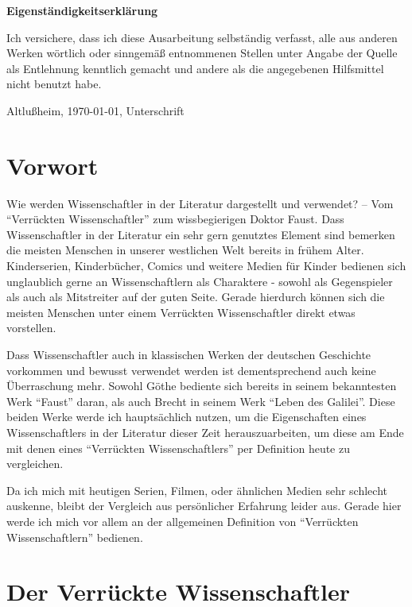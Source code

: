 \documentclass[12pt]{scrreprt}
\begin{document}
\makeititle
\begin{center}
	\sffamily\bfseries{Eigenständigkeitserklärung}
\end{center}
Ich versichere, dass ich diese Ausarbeitung selbständig verfasst, alle aus
anderen Werken wörtlich oder sinngemäß entnommenen Stellen unter Angabe der
Quelle als Entlehnung kenntlich gemacht und andere als die angegebenen
Hilfsmittel nicht benutzt habe.

Altlußheim, \today, Unterschrift
\tableofcontents
\listoftables

\chapter{Vorwort}
	\label{chap:vorwort}
Wie werden Wissenschaftler in der Literatur dargestellt und verwendet? – Vom \enquote{Verrückten Wissenschaftler} zum wissbegierigen Doktor Faust.
\smallskip\newline
Dass Wissenschaftler in der Literatur ein sehr gern genutztes Element sind bemerken die meisten Menschen in unserer westlichen Welt bereits in frühem Alter. 
Kinderserien, Kinderbücher, Comics und weitere Medien für Kinder bedienen sich unglaublich gerne an Wissenschaftlern als Charaktere - sowohl als Gegenspieler als auch als Mitstreiter auf der guten Seite.
Gerade hierdurch können sich die meisten Menschen unter einem Verrückten Wissenschaftler direkt etwas vorstellen.

Dass Wissenschaftler auch in klassischen Werken der deutschen Geschichte vorkommen und bewusst verwendet werden ist dementsprechend auch keine Überraschung mehr.
Sowohl Göthe bediente sich bereits in seinem bekanntesten Werk \enquote{Faust} daran, als auch Brecht in seinem Werk \enquote{Leben des Galilei}.
Diese beiden Werke werde ich hauptsächlich nutzen, um die Eigenschaften eines Wissenschaftlers in der Literatur dieser Zeit herauszuarbeiten, um diese am Ende mit denen eines \enquote{Verrückten Wissenschaftlers} per Definition heute zu vergleichen.

Da ich mich mit heutigen Serien, Filmen, oder ähnlichen Medien sehr schlecht auskenne, bleibt der Vergleich aus persönlicher Erfahrung leider aus.
Gerade hier werde ich mich vor allem an der allgemeinen Definition von \enquote{Verrückten Wissenschaftlern} bedienen.

\chapter{Der Verrückte Wissenschaftler}
	\label{chap:der verrückte Wissenschaftler}
\end{document}
